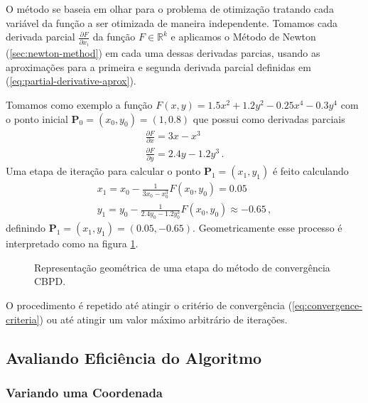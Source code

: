 O método se baseia em olhar para o problema de otimização tratando cada variável da função a ser otimizada de maneira independente. Tomamos cada derivada parcial $\frac{\partial F}{\partial x_i}$ da função $F \in \mathds{R}^k$ e aplicamos o Método de Newton (\ref{sec:newton-method}) em cada uma dessas derivadas parcias, usando as aproximações para a primeira e segunda derivada parcial definidas em (\ref{eq:partial-derivative-aprox}).

Tomamos como exemplo a função $F(x,y) = 1.5x^2 + 1.2y^2 - 0.25x^4 - 0.3y^4$ com o ponto inicial $\mathbf{P}_0 = (x_0,y_0) = (1, 0.8)$ que possui como derivadas parciais
%
\begin{equation}
  \begin{split}
    \frac{\partial F}{\partial x} = 3x - x^3 \\
    \frac{\partial F}{\partial y} = 2.4y - 1.2y^3 \,.
  \end{split}
\end{equation} 
%
Uma etapa de iteração para calcular o ponto $\mathbf{P}_1 = (x_1,y_1)$ é feito calculando
\begin{equation}
  \begin{split}
    x_1 = x_0 - \frac{1}{3x_0 - x_0^3} F(x_0, y_0) = 0.05\\
    y_1 = y_0 - \frac{1}{2.4y_0 - 1.2y_0^3} F(x_0, y_0) \approx -0.65 \,,
  \end{split}
\end{equation}
%
definindo $\mathbf{P}_1 = (x_1,y_1) = (0.05, -0.65)$. Geometricamente esse processo é interpretado como na figura \ref{fig:cbpd_geom_interp}.

\begin{figure}
  \begin{center}
    
  \end{center}
  \caption{Representação geométrica de uma etapa do método de convergência CBPD.}
  \label{fig:cbpd_geom_interp}
\end{figure}

O procedimento é repetido até atingir o critério de convergência (\ref{eq:convergence-criteria}) ou até atingir um valor máximo arbitrário de iterações.


\subsection{Avaliando Eficiência do Algoritmo}

\subsubsection{Variando uma Coordenada}

